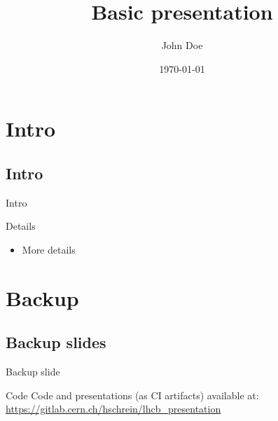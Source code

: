 \documentclass{beamer}
\title{Basic presentation}
\author{John Doe\textcolor{lhcbRed}{\inst{1}}}
\institute{\inst{1} University of Cincinnati}
\date{\today}
\begin{document}
\begin{frame}
\titlepage
\end{frame}

\section{Intro}
\subsection{Intro}
\begin{frame}{Intro}

  \begin{block}{Details}
    \begin{itemize}
    	\item More details
   \end{itemize}
  \end{block}
  
\end{frame}


\backupbegin
\section{Backup}

\subsection{Backup slides}
\begin{frame}{Backup slide}
\end{frame}

\begin{frame}{Code}
	Code and presentations (as CI artifacts) available at: \url{https://gitlab.cern.ch/hschrein/lhcb_presentation}
\end{frame}

\backupend
\end{document}
